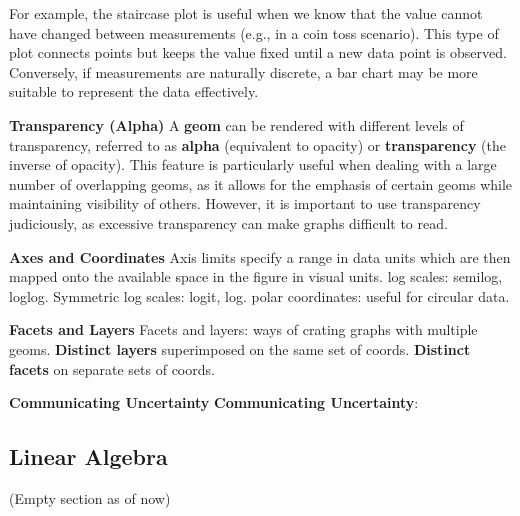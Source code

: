 \documentclass{article}
\begin{document}
\noindent For example, the staircase plot is useful when we know that the value cannot have changed between measurements (e.g., in a coin toss scenario).
This type of plot connects points but keeps the value fixed until a new data point is observed.
Conversely, if measurements are naturally discrete, a bar chart may be more suitable to represent the data effectively.

\noindent \textbf{Transparency (Alpha)}
\noindent A \textbf{geom} can be rendered with different levels of transparency,
referred to as \textbf{alpha} (equivalent to opacity) or
\textbf{transparency} (the inverse of opacity).
This feature is particularly useful when dealing with a large number
of overlapping geoms, as it allows for the emphasis of certain geoms
while maintaining visibility of others.
However, it is important to use transparency judiciously, as excessive
transparency can make graphs difficult to read.

\noindent \textbf{Axes and Coordinates}
\noindent Axis limits specify a range in data units which are then mapped onto the available space in the figure in visual units.
\noindent log scales: semilog, loglog. Symmetric log scales: logit, log.
\noindent polar coordinates: useful for circular data.

\noindent \textbf{Facets and Layers}
\noindent Facets and layers: ways of crating graphs with multiple geoms.
\textbf{Distinct layers} superimposed on the same set of coords.
\textbf{Distinct facets} on separate sets of coords.

\noindent \textbf{Communicating Uncertainty}
\noindent \textbf{Communicating Uncertainty}:


\subsection*{Linear Algebra}
\noindent (Empty section as of now)
\end{document}
